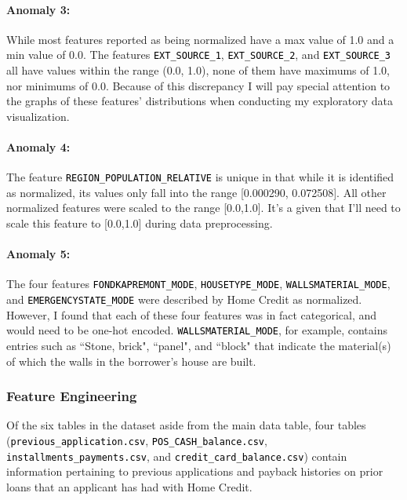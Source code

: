 \documentclass[12pt, letterpaper]{article}
\begin{document}
\paragraph{Anomaly 3:}
While most features reported as being normalized have a max value of 1.0 and a min value of 0.0. The features \colorbox{backcolor}{\textcolor{black}{\texttt{EXT_SOURCE_1}}}, \colorbox{backcolor}{\textcolor{black}{\texttt{EXT_SOURCE_2}}}, and \colorbox{backcolor}{\textcolor{black}{\texttt{EXT_SOURCE_3}}} all have values within the range (0.0, 1.0), none of them have maximums of 1.0, nor minimums of 0.0. Because of this discrepancy I will pay special attention to the graphs of these features' distributions when conducting my exploratory data visualization.

\paragraph{Anomaly 4:}
The feature \colorbox{backcolor}{\textcolor{black}{\texttt{REGION_POPULATION_RELATIVE}}} is unique in that while it is identified as normalized, its values only fall into the range [0.000290, 0.072508]. All other normalized features were scaled to the range [0.0,1.0]. It's a given that I'll need to scale this feature to [0.0,1.0] during data preprocessing.

\paragraph{Anomaly 5:}
The four features \colorbox{backcolor}{\textcolor{black}{\texttt{FONDKAPREMONT_MODE}}}, \colorbox{backcolor}{\textcolor{black}{\texttt{HOUSETYPE_MODE}}}, \colorbox{backcolor}{\textcolor{black}{\texttt{WALLSMATERIAL_MODE}}}, and \colorbox{backcolor}{\textcolor{black}{\texttt{EMERGENCYSTATE_MODE}}} were described by Home Credit as normalized. However, I found that each of these four features was in fact categorical, and would need to be one-hot encoded. \colorbox{backcolor}{\textcolor{black}{\texttt{WALLSMATERIAL_MODE}}}, for example, contains entries such as ``Stone, brick", ``panel", and ``block" that indicate the material(s) of which the walls in the borrower's house are built.

\subsubsection{Feature Engineering}
Of the six tables in the dataset aside from the main data table, four tables (\colorbox{backcolor}{\textcolor{black}{\texttt{previous_application.csv}}}, \colorbox{backcolor}{\textcolor{black}{\texttt{POS_CASH_balance.csv}}}, \colorbox{backcolor}{\textcolor{black}{\texttt{installments_payments.csv}}}, and \colorbox{backcolor}{\textcolor{black}{\texttt{credit_card_balance.csv}}}) contain information pertaining to previous applications and payback histories on prior loans that an applicant has had with Home Credit.
\end{document}
